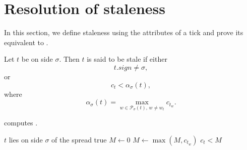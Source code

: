 \section{Resolution of staleness} \label{sec:staleness}
In this section, we define staleness using the attributes of a tick and prove its equivalent to .
\begin{definition}[Staleness] \label{def:stale}
    Let $t$ be on side $\sigma$. Then $t$ is said to be stale if either
    \begin{equation*}
        t.\mathit{sign}\neq\sigma,
    \end{equation*}
    or
    \begin{equation*}
        c_t<\alpha_\sigma(t),
    \end{equation*}
    where 
    \begin{equation*}
        \alpha_\sigma(t)=\max_{w\in\mathcal{P}_\sigma(t),\,w\neq w_t} c_{t_w}.
    \end{equation*}
\end{definition}
 computes .
\begin{algorithm}[htbp!]
\caption{Staleness predicate for a tick $t$ on side $\sigma$ of the spread}\label{alg:stale}
    \begin{algorithmic}[1]
        \Require $t$ lies on side $\sigma$ of the spread
         \Return true \label{ln:sign}
        \EndIf
        \State $M\gets 0$
            \State $M\gets\max(M,c_{t_w})$
        \EndFor
    \State \Return $c_t<M$
    \end{algorithmic}
\end{algorithm}


